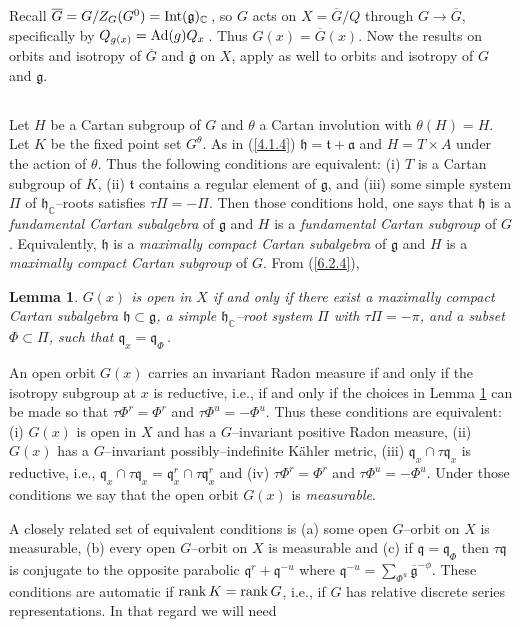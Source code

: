\documentclass{conm-p-l}
\newtheorem{lemma}[equation]{Lemma}
\renewcommand{\gg}{\mathfrak{g}}
\newcommand{\gq}{\mathfrak{q}}
\def\ga{\mathfrak{a}}
\def\gg{\mathfrak{g}}
\def\gh{\mathfrak{h}}
\def\gq{\mathfrak{q}}
\def\gt{\mathfrak{t}}
\def\Int{{\rm Int}}
\def\Ad{{\rm Ad}}
\def\rank{{\rm rank\,}}
\def\C{\mathbb{C}}
\begin{document}
Recall $\overline{G} = G/Z_G(G^0) = \Int(\gg)_\C$\,, so $G$ acts on 
$X = \overline{G}/Q$ through $G \to \overline{G}$, specifically by
$Q_{g(x)} = \Ad(g)Q_x$\,.  Thus $G(x) = \overline{G}(x)$.  Now the results
on orbits and isotropy of $\overline{G}$ and $\overline{\gg}$ on $X$,
apply as well to orbits and isotropy of $G$ and $\gg$.

\subsection{}\label{ssec6c}\setcounter{equation}{0}
Let $H$ be a Cartan subgroup of $G$ and $\theta$ a Cartan involution with
$\theta(H) = H$.  Let $K$ be the fixed point set $G^\theta$.  As in
(\ref{4.1.4}) $\gh = \gt + \ga$ and $H = T\times A$ under the action of
$\theta$.  Thus \cite[Theorem 4.5]{W1969} the following conditions are 
equivalent: (i) $T$ is a
Cartan subgroup of $K$, (ii) $\gt$ contains a regular element of $\gg$,
and (iii) some simple system $\Pi$ of $\gh_\C$--roots satisfies
$\tau\Pi = -\Pi$.  Then those conditions hold, one says that $\gh$ is a
{\em fundamental Cartan subalgebra} of $\gg$ and $H$ is a
{\em fundamental Cartan subgroup} of $G$.  Equivalently, $\gh$ is a
{\em maximally compact Cartan subalgebra} of $\gg$ and $H$ is a
{\em maximally compact Cartan subgroup} of $G$.  From (\ref{6.2.4}),
\begin{lemma}\label{6.4.2} $G(x)$ is open in $X$ if and only if there
exist a maximally compact Cartan subalgebra $\gh \subset \gg$,
a simple $\gh_\C$--root system $\Pi$ with $\tau\Pi = -\pi$, and a
subset $\Phi \subset \Pi$, such that $\gq_x = \gq_\Phi$\,.
\end{lemma}

An open orbit $G(x)$ carries an invariant Radon measure if and only
if the isotropy subgroup at $x$ is reductive, i.e., if and only
if the choices in Lemma \ref{6.4.2} can be made so that
$\tau\Phi^r = \Phi^r$ and $\tau\Phi^u = -\Phi^u$.  Thus 
\cite[Theorem 6.3]{W1969} these
conditions are equivalent: (i) $G(x)$ is open in $X$ and has a
$G$--invariant positive Radon measure, (ii) $G(x)$ has a $G$--invariant
possibly--indefinite K\"ahler metric, (iii) $\gq_x\cap\tau\gq_x$ is
reductive, i.e., $\gq_x\cap\tau\gq_x = \gq_x^r \cap \tau\gq_x^r$ and
(iv) $\tau\Phi^r = \Phi^r$ and $\tau\Phi^u = -\Phi^u$.  Under those
conditions we say that the open orbit $G(x)$ is {\em measurable}.

A closely related set of equivalent conditions \cite[Theorem 6.7]{W1969} is
(a) some open $G$--orbit on $X$ is measurable, (b) every open 
$G$--orbit on $X$ is measurable and (c) if $\gq = \gq_\Phi$ then
$\tau\gq$ is conjugate to the opposite parabolic $\gq^r + \gq^{-u}$
where $\gq^{-u} = \sum_{\Phi^u}\overline{\gg}^{-\phi}$.
These conditions are automatic  \cite[Corollary 6.8]{W1969} if
$\rank K = \rank G$, i.e., if $G$ has relative discrete series 
representations.  In that regard we will need
\end{document}
